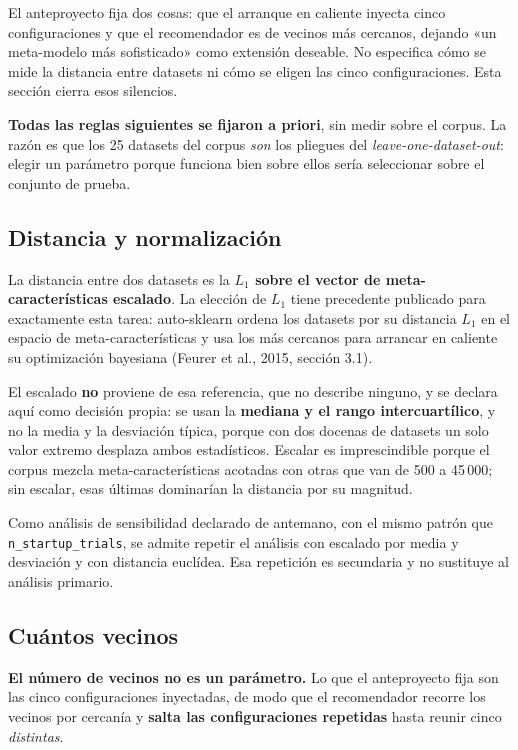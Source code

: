 \documentclass[11pt,letterpaper]{article}
\begin{document}
El anteproyecto fija dos cosas: que el arranque en caliente inyecta cinco
configuraciones y que el recomendador es de vecinos más cercanos, dejando «un
meta-modelo más sofisticado» como extensión deseable. No especifica cómo se mide
la distancia entre datasets ni cómo se eligen las cinco configuraciones. Esta
sección cierra esos silencios.

\textbf{Todas las reglas siguientes se fijaron a priori}, sin medir sobre el
corpus. La razón es que los 25 datasets del corpus \emph{son} los pliegues del
\textit{leave-one-dataset-out}: elegir un parámetro porque funciona bien sobre
ellos sería seleccionar sobre el conjunto de prueba.

\subsection{Distancia y normalización}

La distancia entre dos datasets es la \textbf{$L_1$ sobre el vector de
meta-características escalado}. La elección de $L_1$ tiene precedente publicado
para exactamente esta tarea: auto-sklearn ordena los datasets por su distancia
$L_1$ en el espacio de meta-características y usa los más cercanos para arrancar
en caliente su optimización bayesiana (Feurer et al., 2015, sección 3.1).

El escalado \textbf{no} proviene de esa referencia, que no describe ninguno, y se
declara aquí como decisión propia: se usan la \textbf{mediana y el rango
intercuartílico}, y no la media y la desviación típica, porque con dos docenas de
datasets un solo valor extremo desplaza ambos estadísticos. Escalar es
imprescindible porque el corpus mezcla meta-características acotadas con otras
que van de 500 a 45\,000; sin escalar, esas últimas dominarían la distancia por su
magnitud.

Como análisis de sensibilidad declarado de antemano, con el mismo patrón que
\texttt{n\_startup\_trials}, se admite repetir el análisis con escalado por media
y desviación y con distancia euclídea. Esa repetición es secundaria y no
sustituye al análisis primario.

\subsection{Cuántos vecinos}

\textbf{El número de vecinos no es un parámetro.} Lo que el anteproyecto fija son
las cinco configuraciones inyectadas, de modo que el recomendador recorre los
vecinos por cercanía y \textbf{salta las configuraciones repetidas} hasta reunir
cinco \emph{distintas}.
\end{document}
